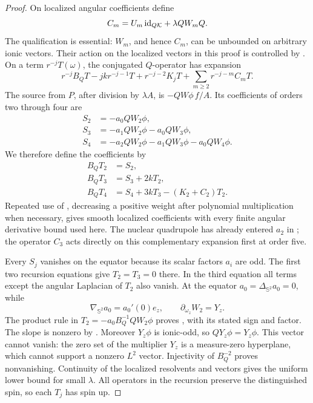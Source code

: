 \begin{proof}
On localized angular coefficients define
\[
 C_m=U_m\,\mathrm{id}_{Q\mathcal K}+\lambda QW_mQ.
 \]
The qualification is essential: \(W_m\), and hence \(C_m\), can
be unbounded on arbitrary ionic vectors.  Their action on the
localized vectors in this proof is controlled by
.
On a term \(r^{-j}T(\omega)\), the conjugated \(Q\)-operator has
expansion
\begin{equation}
 r^{-j}B_QT-jk r^{-j-1}T
 +r^{-j-2}K_jT+\sum_{m\geq2}r^{-j-m}C_mT.
 \label{eq:complementary-recursion-action}
\end{equation}
The source from \(P\), after division by \(\lambda A\), is
\(-QW\phi\,f/A\).  Its coefficients of orders two through four are
\[
 \begin{split}
 S_2&=-a_0QW_2\phi,\\
 S_3&=-a_1QW_2\phi-a_0QW_3\phi,\\
 S_4&=-a_2QW_2\phi-a_1QW_3\phi-a_0QW_4\phi.
 \end{split}
 \]
We therefore define the coefficients by
\begin{equation}
 \begin{split}
 B_QT_2&=S_2,\\
 B_QT_3&=S_3+2kT_2,\\
 B_QT_4&=S_4+3kT_3-(K_2+C_2)T_2.
 \end{split}
 \label{eq:complementary-recursion}
\end{equation}
Repeated use of , decreasing a
positive weight after polynomial multiplication when necessary,
gives smooth localized coefficients with every finite angular
derivative bound used here.  The nuclear quadrupole has already
entered \(a_2\) in ;
the operator \(C_3\) acts directly on this complementary expansion
first at order five.

Every \(S_j\) vanishes on the equator because its scalar factors
\(a_i\) are odd.  The first two recursion equations give
\(T_2=T_3=0\) there.  In the third equation all terms except the
angular Laplacian of \(T_2\) also vanish.  At the equator
\(a_0=\Delta_{\mathbb S^2}a_0=0\), while
\[
 \nabla_{\mathbb S^2}a_0=a_0'(0)e_z,\qquad
 \partial_{\omega_z}W_2=Y_z.
 \]
The product rule in \(T_2=-a_0B_Q^{-1}QW_2\phi\) proves
, with its stated sign and factor.
The slope is nonzero by .
Moreover \(Y_z\phi\) is ionic-odd, so \(QY_z\phi=Y_z\phi\).
This vector cannot vanish: the zero set of the multiplier \(Y_z\)
is a measure-zero hyperplane, which cannot support a nonzero
\(L^2\) vector.  Injectivity of \(B_Q^{-2}\) proves nonvanishing.
Continuity of the localized resolvents and vectors gives the
uniform lower bound for small \(\lambda\).  All operators in the
recursion preserve the distinguished spin, so each \(T_j\) has
spin up.


\end{proof}
